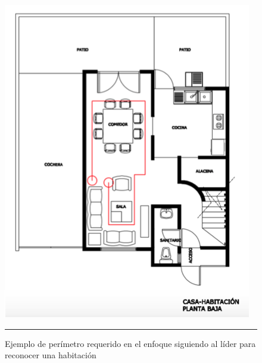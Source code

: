 \begin{figure}[htbp]
	\centering
		\includegraphics{Figuras/ejSigLider.png}
		\rule{35em}{0.5pt}
	\caption[Perímetro requerido en el enfoque siguiendo al líder  para reconocer una habitación]{Ejemplo de perímetro requerido en el enfoque siguiendo al líder  para reconocer una habitación}
	\label{fig:ejSigLider}
\end{figure}